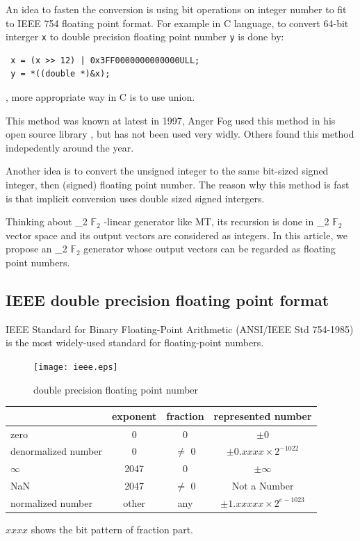 \documentclass{svmult}
\def\bbf2{\ifmmode \mathbb{F}_2 \else $\mathbb{F}_2$ \fi}
\begin{document}
An idea to fasten the conversion is using bit operations on integer
number to fit to IEEE 754 floating point format. For example in C
language, to convert 64-bit interger \texttt{x} to double precision floating
point number \texttt{y} is done by:
\begin{verbatim}
 x = (x >> 12) | 0x3FF0000000000000ULL;
 y = *((double *)&x);
\end{verbatim}, more appropriate way in C is to use union.

This method was known at latest in 1997, Anger Fog used this
method in his open source library \cite{Fog}, but has not been
used very widly. Others found this method indepedently around
the year.

Another idea is to convert the unsigned integer to the same bit-sized
signed integer, then (signed) floating point number. The reason why
this method is fast is that implicit conversion uses double sized
signed intergers.

Thinking about \bbf2 -linear generator like MT, its recursion is done
in \bbf2 vector space and its output vectors are considered as
integers.  In this article, we propose an \bbf2 generator whose output
vectors can be regarded as floating point numbers.

\subsection{IEEE double precision floating point format}
\label{sec:ieee}

IEEE Standard for Binary Floating-Point Arithmetic (ANSI/IEEE Std
754-1985) \cite{ieee} is the most widely-used standard for
floating-point numbers.

\begin{center}
  \begin{figure}
    \caption{double precision floating point number \label{fig:ieee}}
    \texttt{[image: ieee.eps]}
  \end{figure}

  \begin{tabular}{|l|c|c|c|} \hline
    & exponent & fraction & represented number \\ \hline
    zero & 0 & 0 & $\pm 0$ \\ \hline
    denormalized number & 0 & $\neq$ 0 & $\pm 0.xxxx \times 2^{-1022}$ \\ \hline
    $\infty$ & 2047 & 0 & $\pm\infty$ \\ \hline
    NaN & 2047 & $\neq$ 0 & Not a Number \\ \hline
    normalized number & 
    other & any & 
    $\pm 1.xxxxx \times 2^{e - 1023}$ \\ \hline
  \end{tabular}

  $xxxx$ shows the bit pattern of fraction part.
\end{center}
\end{document}
